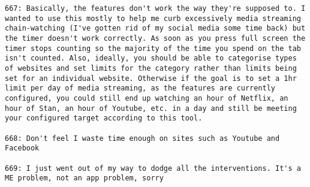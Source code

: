 \begin{lstlisting}[breaklines]
667: Basically, the features don't work the way they're supposed to. I wanted to use this mostly to help me curb excessively media streaming chain-watching (I've gotten rid of my social media some time back) but the timer doesn't work correctly. As soon as you press full screen the timer stops counting so the majority of the time you spend on the tab isn't counted. Also, ideally, you should be able to categorise types of websites and set limits for the category rather than limits being set for an individual website. Otherwise if the goal is to set a 1hr limit per day of media streaming, as the features are currently configured, you could still end up watching an hour of Netflix, an hour of Stan, an hour of Youtube, etc. in a day and still be meeting your configured target according to this tool.

668: Don't feel I waste time enough on sites such as Youtube and Facebook

669: I just went out of my way to dodge all the interventions. It's a ME problem, not an app problem, sorry
\end{lstlisting}
